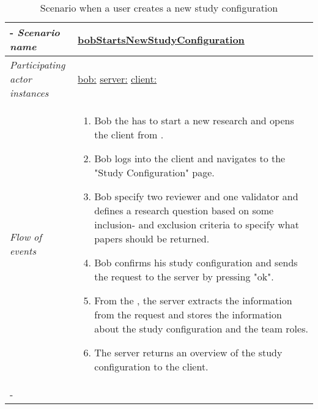 \begin{table}[h!]

\tabulinesep=1.5mm

\begin{tabu} to 
	\tabucline[1.5pt]-
	\textit{Scenario name} & \underline{bobStartsNewStudyConfiguration} \\
	\hline
	\textit{Participating actor \newline instances} & \underline{bob:\researcher} \newline \underline{server:\serverside}
	\newline \underline{client:\clientside} \\
	\hline
	\textit{Flow of events} &
	\vspace{-3mm}
	
	\begin{enumerate}[leftmargin=*,topsep=0pt,itemsep=-1ex]
		\item Bob the \researcher has to start a new research  and opens the client from \clientside. 
		\item Bob logs into the client and navigates to the "Study Configuration" page. 
		
		\item Bob specify two reviewer and one validator and defines a research question based on some inclusion- and exclusion criteria to specify what papers should be returned. 
		
		\item Bob confirms his study configuration and sends the request to the server by pressing "ok".
		
		\item From the \serverside, the server extracts the information from the request and stores the information about the study configuration and the team roles.
		
		\item The server returns an overview of the study configuration to the client.
	\end{enumerate} 
	
	\\
	\tabucline[1.5pt]-
	
\end{tabu}

\caption{Scenario when a user creates a new study configuration}
\label{sc:bobStartsNewStudyConfiguration}

\end{table}

